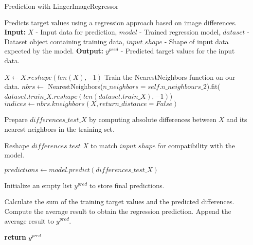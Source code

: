 \documentclass[a4paper, 12pt]{report}
\begin{document}
\begin{algorithm}
    \caption{Prediction with LingerImageRegressor}
    \label{alg:prediction_with_lingerImageRegressor}
    \begin{algorithmic}[1]
        \State Predicts target values using a regression approach based on image differences.
        \State \textbf{Input:} $X$ - Input data for prediction, $model$ - Trained regression model, $dataset$ - Dataset object containing training data, $input\_shape$ - Shape of input data expected by the model.
        \State \textbf{Output:} $y^{pred}$ - Predicted target values for the input data.
        
            \State $X \gets X.reshape(len(X), -1)$
        \EndIf
        \State Train the NearestNeighbors function on our data.
        \State $nbrs \gets$ NearestNeighbors($n\_neighbors=self.n\_neighbours\_2$).fit($dataset.train\_X.reshape(len(dataset.train\_X), -1)$)
        \State $indices \gets nbrs.kneighbors(X, return\_distance=False)$
        
        \State Prepare $differences\_test\_X$ by computing absolute differences between $X$ and its nearest neighbors in the training set.
        
        \State Reshape $differences\_test\_X$ to match $input\_shape$ for compatibility with the model.
        
        \State $predictions \gets model.predict(differences\_test\_X)$
        
        \State Initialize an empty list $y^{pred}$ to store final predictions.
        
            \State Calculate the sum of the training target values and the predicted differences.
            \State Compute the average result to obtain the regression prediction.
            \State Append the average result to $y^{pred}$.
        \EndFor
        
        \State \textbf{return} $y^{pred}$
    \EndProcedure
    \end{algorithmic}
\end{algorithm}
\end{document}
